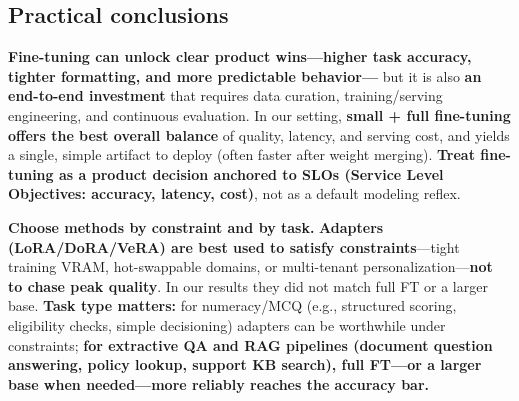 \documentclass[11pt,a4paper]{article}
\begin{document}
\subsection*{Practical conclusions}
\noindent \textbf{Fine-tuning can unlock clear product wins—higher task accuracy, tighter formatting, and more predictable behavior—} but it is also \textbf{an end-to-end investment} that requires data curation, training/serving engineering, and continuous evaluation. In our setting, \textbf{small + full fine-tuning offers the best overall balance} of quality, latency, and serving cost, and yields a single, simple artifact to deploy (often faster after weight merging). \textbf{Treat fine-tuning as a product decision anchored to SLOs (Service Level Objectives: accuracy, latency, cost)}, not as a default modeling reflex.

\medskip
\noindent \textbf{Choose methods by constraint and by task.} \textbf{Adapters (LoRA/DoRA/VeRA) are best used to satisfy constraints}—tight training VRAM, hot-swappable domains, or multi-tenant personalization—\textbf{not to chase peak quality}. In our results they did not match full FT or a larger base. \textbf{Task type matters:} for numeracy/MCQ (e.g., structured scoring, eligibility checks, simple decisioning) adapters can be worthwhile under constraints; \textbf{for extractive QA and RAG pipelines (document question answering, policy lookup, support KB search), full FT—or a larger base when needed—more reliably reaches the accuracy bar.}
\end{document}
